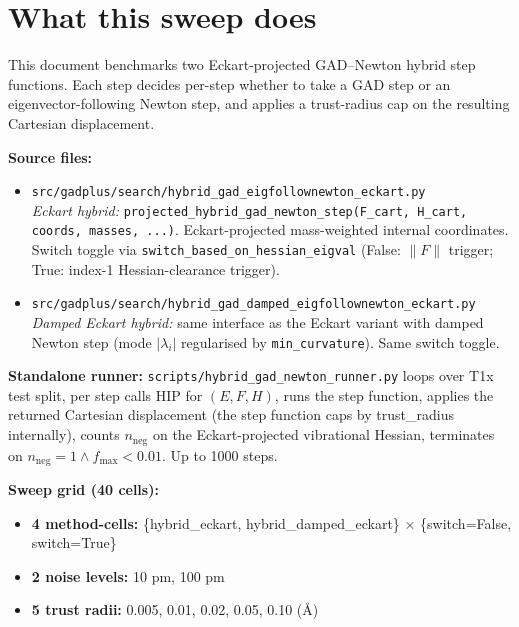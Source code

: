 \documentclass[11pt]{article}
\begin{document}
\section*{What this sweep does}

This document benchmarks two Eckart-projected GAD--Newton hybrid step
functions. Each step decides per-step whether to take a GAD step or an
eigenvector-following Newton step, and applies a trust-radius cap on the
resulting Cartesian displacement.

\textbf{Source files:}
\begin{itemize}[leftmargin=1.5em, itemsep=0.05em]
\item \texttt{src/gadplus/search/hybrid\_gad\_eigfollownewton\_eckart.py}
  \\ \emph{Eckart hybrid:} \texttt{projected\_hybrid\_gad\_newton\_step(F\_cart, H\_cart, coords, masses, ...)}.
  Eckart-projected mass-weighted internal coordinates. Switch toggle
  via \texttt{switch\_based\_on\_hessian\_eigval} (False: $\|F\|$ trigger;
  True: index-1 Hessian-clearance trigger).
\item \texttt{src/gadplus/search/hybrid\_gad\_damped\_eigfollownewton\_eckart.py}
  \\ \emph{Damped Eckart hybrid:} same interface as the Eckart variant
  with damped Newton step (mode $|\lambda_i|$ regularised by
  \texttt{min\_curvature}). Same switch toggle.
\end{itemize}

\textbf{Standalone runner:} \texttt{scripts/hybrid\_gad\_newton\_runner.py}
loops over T1x test split, per step calls HIP for $(E, F, H)$, runs the
step function, applies the returned Cartesian displacement (the step
function caps by trust\_radius internally), counts $n_{\text{neg}}$ on
the Eckart-projected vibrational Hessian, terminates on
$n_{\text{neg}}{=}1 \wedge f_{\max}{<}0.01$. Up to 1000 steps.

\textbf{Sweep grid (40 cells):}
\begin{itemize}[leftmargin=1.5em, itemsep=0.05em]
\item \textbf{4 method-cells:} \{hybrid\_eckart, hybrid\_damped\_eckart\}
  $\times$ \{switch=False, switch=True\}
\item \textbf{2 noise levels:} 10 pm, 100 pm
\item \textbf{5 trust radii:} 0.005, 0.01, 0.02, 0.05, 0.10 (\AA)
\end{itemize}
\end{document}
